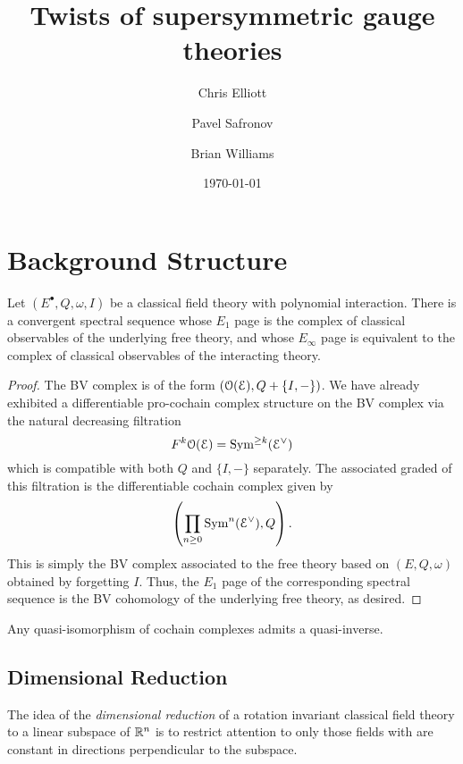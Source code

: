 \documentclass[10pt, oneside]{article}
\title{Twists of supersymmetric gauge theories}
\author{Chris Elliott\and Pavel Safronov \and Brian Williams}
\date{\today}
\begin{document}
\section{Background Structure}

\begin{lemma} \label{free_int_ss_lemma}
Let $(E^\bullet, Q, \omega, I)$ be a classical field theory with polynomial interaction.  There is a convergent spectral sequence whose $E_1$ page is the complex of classical observables of the underlying free theory, and whose $E_\infty$ page is equivalent to the complex of classical observables of the interacting theory.
\end{lemma}
\begin{proof}
The BV complex is of the form $\left(\mathcal O(\mathcal E), Q + \{I,-\}\right)$.
We have already exhibited  a differentiable pro-cochain complex structure on the BV complex via the 
natural decreasing filtration 
\[
F^k \mathcal O (\mathcal E) = {\rm Sym}^{\geq k} (\mathcal E^\vee)
\]
which is compatible with both $Q$ and $\{I,-\}$ separately.
The associated graded of this filtration is the differentiable cochain complex given by
\[
\left(\prod_{n \geq 0} {\rm Sym}^n (\mathcal E^\vee) , Q \right) .
\]
This is simply the BV complex associated to the free theory based on $(E, Q, \omega)$ obtained by forgetting $I$. 
Thus, the $E_1$ page of the corresponding spectral sequence is the BV cohomology of the underlying free theory, as desired. 
 
\end{proof}

\begin{lemma} \label{invert_quis_lemma}
Any quasi-isomorphism of cochain complexes admits a quasi-inverse.
\end{lemma}

\subsection{Dimensional Reduction} \label{dim_red_section}
The idea of the \emph{dimensional reduction} of a rotation invariant classical field theory to a linear subspace of $\mathbb R^n$ is to restrict attention to only those fields with are constant in directions perpendicular to the subspace. 
\end{document}
